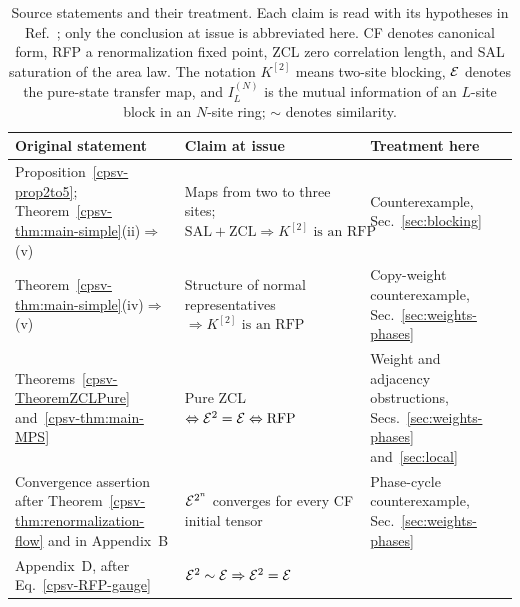 \documentclass[aps,pra,reprint,nofootinbib,onecolumn]{revtex4-2}
\begin{document}
\begin{table}[t]
	\caption{Source statements and their treatment. Each claim is read with
		its hypotheses in Ref.~\cite{Cirac2017MPDO_AnnPhys}; only the conclusion
		at issue is abbreviated here. CF denotes canonical form, RFP a
		renormalization fixed point, ZCL zero correlation length, and SAL
		saturation of the area law. The notation $K^{[2]}$ means two-site
		blocking, $\mathcal{E}$ denotes the pure-state transfer map, and
		$I_L^{(N)}$ is the mutual information of an $L$-site block in an
		$N$-site ring; $\sim$ denotes similarity.}
	\label{tab:source-map}
	\begin{tabular}{@{}p{}p{}p{}@{}}
		\toprule
		Original statement & Claim at issue                                                                                            & Treatment here \\
		\midrule
		\raggedcell Proposition~\ref{cpsv-prop2to5}; Theorem~\ref{cpsv-thm:main-simple}(ii)$\Rightarrow$(v)
		                   & \raggedcell Maps from two to three sites; $\mathrm{SAL}+\mathrm{ZCL}\Rightarrow K^{[2]}\text{ is an RFP}$
		                   & \raggedcell Counterexample, Sec.~\ref{sec:blocking}                                                                        \\[0.4em]
		\raggedcell Theorem~\ref{cpsv-thm:main-simple}(iv)$\Rightarrow$(v)
		                   & \raggedcell Structure of normal representatives $\Rightarrow K^{[2]}\text{ is an RFP}$
		                   & \raggedcell Copy-weight counterexample, Sec.~\ref{sec:weights-phases}                                                      \\[0.4em]
		\raggedcell Theorems~\ref{cpsv-TheoremZCLPure} and~\ref{cpsv-thm:main-MPS}
		                   & \raggedcell Pure ZCL $\Leftrightarrow\mathcal{E}^2=\mathcal{E}\Leftrightarrow\mathrm{RFP}$
		                   & \raggedcell Weight and adjacency obstructions, Secs.~\ref{sec:weights-phases} and~\ref{sec:local}                          \\[0.4em]
		\raggedcell Convergence assertion after Theorem~\ref{cpsv-thm:renormalization-flow} and in Appendix~B
		                   & \raggedcell $\mathcal{E}^{2^n}$ converges for every CF initial tensor
		                   & \raggedcell Phase-cycle counterexample, Sec.~\ref{sec:weights-phases}                                                      \\[0.4em]
		\raggedcell Appendix~D, after Eq.~\eqref{cpsv-RFP-gauge}
		                   & \raggedcell $\mathcal{E}^2\sim\mathcal{E}\Rightarrow\mathcal{E}^2=\mathcal{E}$

\end{tabular}
\end{table}
\end{document}
